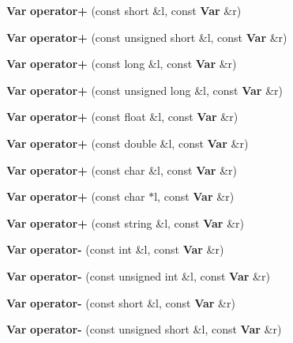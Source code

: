 \begin{CompactItemize}
\item 
{\bf Var} \textbf{operator+} (const short \&l, const {\bf Var} \&r)\label{classVar_62ca1b32353fa939f1c4368f8aa80a38}

\item 
{\bf Var} \textbf{operator+} (const unsigned short \&l, const {\bf Var} \&r)\label{classVar_7b0b86aacc7d03ad7c032e62c9e0be0c}

\item 
{\bf Var} \textbf{operator+} (const long \&l, const {\bf Var} \&r)\label{classVar_ae7664cf10202bf6cd0b8d83e64fa825}

\item 
{\bf Var} \textbf{operator+} (const unsigned long \&l, const {\bf Var} \&r)\label{classVar_eecfe7eb3700cee039f87f8a6549e055}

\item 
{\bf Var} \textbf{operator+} (const float \&l, const {\bf Var} \&r)\label{classVar_d8877e6026e286a940e2bd1cfdc2c669}

\item 
{\bf Var} \textbf{operator+} (const double \&l, const {\bf Var} \&r)\label{classVar_70cc2c56b604013cb09a4b6f27217ce3}

\item 
{\bf Var} \textbf{operator+} (const char \&l, const {\bf Var} \&r)\label{classVar_4e030811872ef1975afd95c6a224b9a4}

\item 
{\bf Var} \textbf{operator+} (const char $\ast$l, const {\bf Var} \&r)\label{classVar_46aa3d8c4ecd5cee2935bfcaf7f7c214}

\item 
{\bf Var} \textbf{operator+} (const string \&l, const {\bf Var} \&r)\label{classVar_e451950dbece221b6b64ebd7f0edff0a}

\item 
{\bf Var} \textbf{operator-} (const int \&l, const {\bf Var} \&r)\label{classVar_dde335d9e939cf1cd3973e4ecdace55e}

\item 
{\bf Var} \textbf{operator-} (const unsigned int \&l, const {\bf Var} \&r)\label{classVar_7c43f39734e8d41aa205d82be7cb5d38}

\item 
{\bf Var} \textbf{operator-} (const short \&l, const {\bf Var} \&r)\label{classVar_4f7449625789e17bc472af57fad227e7}

\item 
{\bf Var} \textbf{operator-} (const unsigned short \&l, const {\bf Var} \&r)\label{classVar_dc417ed717b1ac7561b106ec1e539303}


\end{CompactItemize}
